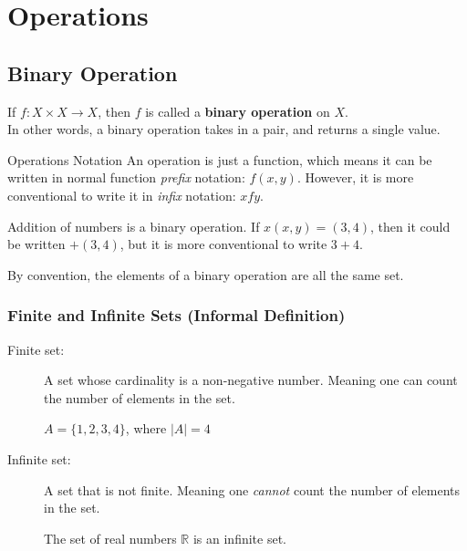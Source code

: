 \documentclass[../notes.tex]{subfiles}
\begin{document}
	\ifSubfilesClassLoaded{\setcounter{chapter}{7}}{}
	\chapter{Operations}
		\section{Binary Operation}
			If $f: X \times X \rightarrow X$, then $f$ is called a \textbf{binary operation} on $X$.\\
			In other words, a binary operation takes in a pair, and returns a single value.
			\begin{notebox}{Operations Notation}
				An operation is just a function, which means it can be written in normal function \textit{prefix} notation: $f(x, y)$. However, it is more conventional to write it in \textit{infix} notation: $x f y$.
				\begin{examplebox}
					Addition of numbers is a binary operation. If $x(x, y) = (3, 4)$, then it could be written $+(3, 4)$, but it is more conventional to write $3 + 4$.
				\end{examplebox}
			\end{notebox}
			By convention, the elements of a binary operation are all the same set.
			\subsection[Finte and Infinite Sets]{Finite and Infinite Sets (Informal Definition)}
				\begin{description}
					\item[Finite set:] A set whose cardinality is a non-negative number. Meaning one can count the number of elements in the set.
						\begin{examplebox}
							$A = \{1, 2, 3, 4\}$, where $\left\lvert A\right\rvert = 4$
						\end{examplebox}
					\item[Infinite set:] A set that is not finite. Meaning one \textit{cannot} count the number of elements in the set.
						\begin{examplebox}
							The set of real numbers $\mathbb{R}$ is an infinite set.
						\end{examplebox}
				\end{description}
			\pagebreak
\end{document}
